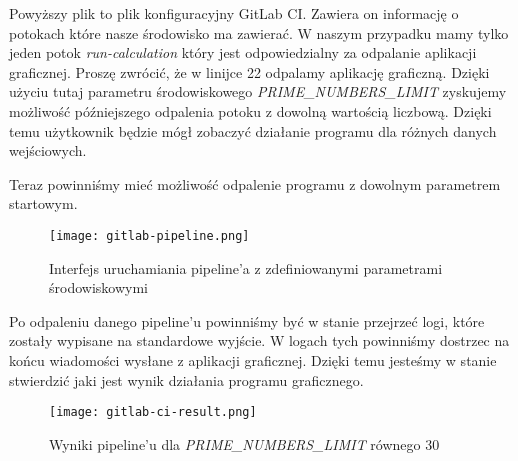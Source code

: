 Powyższy plik to plik konfiguracyjny GitLab CI. Zawiera on informację o potokach które nasze środowisko ma zawierać. W naszym przypadku mamy tylko jeden potok \textit{run-calculation} który jest odpowiedzialny za odpalanie aplikacji graficznej. Proszę zwrócić, że w linijce 22 odpalamy aplikację graficzną. Dzięki użyciu tutaj parametru środowiskowego \textit{PRIME\_NUMBERS\_LIMIT} zyskujemy możliwość późniejszego odpalenia potoku z dowolną wartością liczbową. Dzięki temu użytkownik będzie mógł zobaczyć działanie programu dla różnych danych wejściowych.
\par
Teraz powinniśmy mieć możliwość odpalenie programu z dowolnym parametrem startowym.
\begin{figure}[htbp]
  \centering
  \texttt{[image: gitlab-pipeline.png]}
  \caption{Interfejs uruchamiania pipeline'a z zdefiniowanymi parametrami środowiskowymi}
  \label{fig:gitlab_pipeline}
\end{figure}
Po odpaleniu danego pipeline'u powinniśmy być w stanie przejrzeć logi, które zostały wypisane na standardowe wyjście. W logach tych powinniśmy dostrzec na końcu wiadomości wysłane z aplikacji graficznej. Dzięki temu jesteśmy w stanie stwierdzić jaki jest wynik działania programu graficznego.
\begin{figure}[htbp]
  \centering
  \texttt{[image: gitlab-ci-result.png]}
  \caption{Wyniki pipeline'u dla \textit{PRIME\_NUMBERS\_LIMIT} równego 30}
  \label{fig:gitlab_pipeline_result}
\end{figure}

